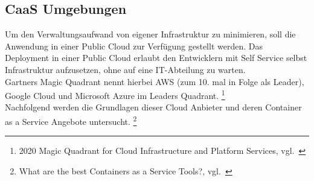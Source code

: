 \newpage
\subsection{CaaS Umgebungen}\label{caas}

Um den Verwaltungsaufwand von eigener Infrastruktur zu minimieren, soll die Anwendung in einer Public Cloud zur Verfügung gestellt werden.
Das Deployment in einer Public Cloud erlaubt den Entwicklern mit Self Service selbst Infrastruktur aufzusetzen, ohne auf eine IT-Abteilung zu warten. \\

Gartners Magic Quadrant nennt hierbei AWS (zum 10. mal in Folge als Leader), Google Cloud und Microsoft Azure im Leaders Quadrant.
\footnote{{2020 Magic Quadrant for Cloud Infrastructure and Platform Services, vgl.~\cite{AWS_GARTNER}}} \\

Nachfolgend werden die Grundlagen dieser Cloud Anbieter und deren Container as a Service Angebote untersucht.
\footnote{{What are the best Containers as a Service Tools?, vgl.~\cite{STACKSHARE_CAAS}}}
